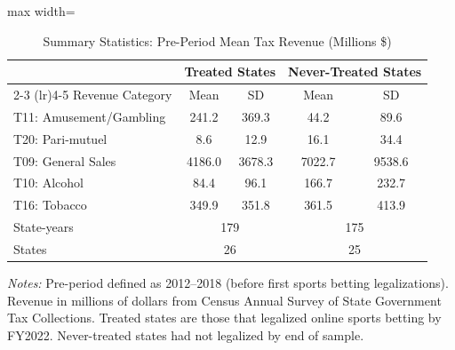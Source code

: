 \begin{table}[htbp]
\centering
\caption{Summary Statistics: Pre-Period Mean Tax Revenue (Millions \$)}
\label{tab:summary}
\begin{adjustbox}{max width=\textwidth}
\begin{tabular}{lcccc}
\hline\hline
 & \multicolumn{2}{c}{Treated States} & \multicolumn{2}{c}{Never-Treated States} \\
\cmidrule(lr){2-3} \cmidrule(lr){4-5}
Revenue Category & Mean & SD & Mean & SD \\
\hline
T11: Amusement/Gambling & 241.2 & 369.3 & 44.2 & 89.6 \\
T20: Pari-mutuel & 8.6 & 12.9 & 16.1 & 34.4 \\
T09: General Sales & 4186.0 & 3678.3 & 7022.7 & 9538.6 \\
T10: Alcohol & 84.4 & 96.1 & 166.7 & 232.7 \\
T16: Tobacco & 349.9 & 351.8 & 361.5 & 413.9 \\
\hline
State-years & \multicolumn{2}{c}{179} & \multicolumn{2}{c}{175} \\
States & \multicolumn{2}{c}{26} & \multicolumn{2}{c}{25} \\
\hline\hline
\end{tabular}
\end{adjustbox}
\begin{minipage}{0.95\textwidth}
\vspace{0.3em}
\footnotesize \textit{Notes:} Pre-period defined as 2012--2018 (before first sports betting legalizations). Revenue in millions of dollars from Census Annual Survey of State Government Tax Collections. Treated states are those that legalized online sports betting by FY2022. Never-treated states had not legalized by end of sample.
\end{minipage}
\end{table}

